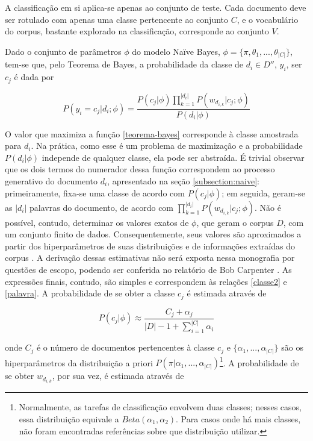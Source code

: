  A classificação em si aplica-se apenas ao conjunto de teste. Cada documento deve ser rotulado com apenas uma classe pertencente ao conjunto \ensuremath{C}, e o vocabulário do corpus, bastante explorado na classificação, corresponde ao conjunto \ensuremath{V}. %

Dado o conjunto de parâmetros \ensuremath{\phi} do modelo Naïve Bayes, \ensuremath{\phi = \{\pi, \theta_1, ..., \theta_{|C|}\}}, tem-se que, pelo Teorema de Bayes, a probabilidade da classe de \ensuremath{d_i \in D''}, \ensuremath{y_i}, ser \ensuremath{c_j} é dada por

\begin{equation}
\label{teorema-bayes}
\ensuremath{P(y_i = c_j | d_i ; \phi) = \frac{P(c_j | \phi)\prod_{k = 1}^{|d_i|}P(w_{d_{i,k}} | c_j; \phi)}{P(d_i | \phi)}}
\end{equation}

O valor que maximiza a função \ref{teorema-bayes} corresponde à classe amostrada para \ensuremath{d_i}. Na prática, como esse é um problema de maximização e a probabilidade \ensuremath{P(d_i | \phi)} independe de qualquer classe, ela pode ser abstraída. É trivial observar que os dois termos do numerador dessa função correspondem ao processo generativo do documento \ensuremath{d_i}, apresentado na seção \ref{subsection:naive}: primeiramente, fixa-se uma classe de acordo com  \ensuremath{P(c_j | \phi)}; em seguida, geram-se as \ensuremath{|d_i|} palavras do documento, de acordo com \ensuremath{\prod_{k = 1}^{|d_i|}P(w_{d_{i,k}} | c_j; \phi)}. Não é possível, contudo, determinar os valores exatos de \ensuremath{\phi}, que geram o corpus \ensuremath{D}, com um conjunto finito de dados. Consequentemente, seus valores são aproximados a partir dos hiperparâmetros de suas distribuições e de informações extraídas do corpus \cite{nigam}. A derivação dessas estimativas não será exposta nessa monografia por questões de escopo, podendo ser conferida no relatório de Bob Carpenter \cite{gibbs-lingpipe}. As expressões finais, contudo, são simples e correspondem às relações \ref{classe2} e \ref{palavra}. A probabilidade de se obter a classe \ensuremath{c_j} é estimada através de 

\begin{equation}
\label{classe2}
\ensuremath{P(c_j | \phi) \approx \frac{C_j + \alpha_j}{|D| - 1 + \sum_{i = 1}^{|C|}\alpha_i}}
\end{equation}

onde \ensuremath{C_j} é o número de documentos pertencentes à classe \ensuremath{c_j} e \ensuremath{\{\alpha_1, ..., \alpha_{|C|}\}} são os hiperparâmetros da distribuição a priori \ensuremath{P(\pi | \alpha_1, ..., \alpha_{|C|})}\footnote{Normalmente, as tarefas de classificação envolvem duas classes; nesses casos, essa distribuição equivale a \ensuremath{Beta(\alpha_1, \alpha_2)}. Para casos onde há mais classes, não foram encontradas referências sobre que distribuição utilizar.}. A probabilidade de se obter \ensuremath{w_{d_{i,k}}}, por sua vez, é estimada através de
 
